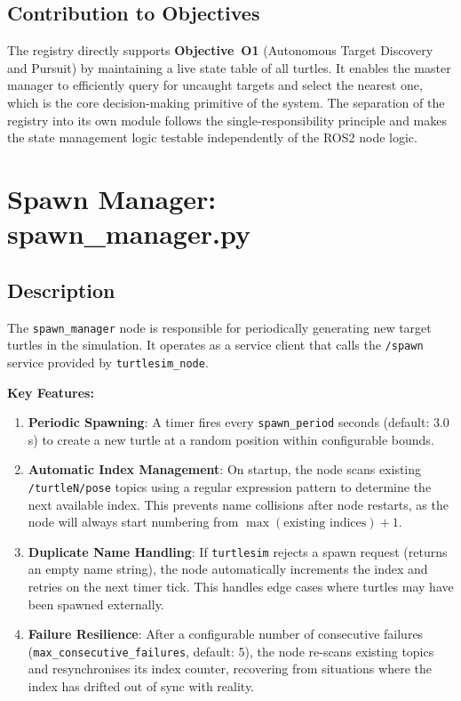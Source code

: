 \subsection{Contribution to Objectives}

The registry directly supports \textbf{Objective~O1} (Autonomous Target Discovery and Pursuit) by maintaining a live state table of all turtles. It enables the master manager to efficiently query for uncaught targets and select the nearest one, which is the core decision-making primitive of the system. The separation of the registry into its own module follows the single-responsibility principle and makes the state management logic testable independently of the ROS2 node logic.

\section{Spawn Manager: spawn\_manager.py}

\subsection{Description}

The \texttt{spawn\_manager} node is responsible for periodically generating new target turtles in the simulation. It operates as a service client that calls the \texttt{/spawn} service provided by \texttt{turtlesim\_node}.

\textbf{Key Features:}

\begin{enumerate}
  \item \textbf{Periodic Spawning}: A timer fires every \texttt{spawn\_period} seconds (default: 3.0\,s) to create a new turtle at a random position within configurable bounds.

  \item \textbf{Automatic Index Management}: On startup, the node scans existing \texttt{/turtleN/pose} topics using a regular expression pattern to determine the next available index. This prevents name collisions after node restarts, as the node will always start numbering from $\max(\text{existing indices}) + 1$.

  \item \textbf{Duplicate Name Handling}: If \texttt{turtlesim} rejects a spawn request (returns an empty name string), the node automatically increments the index and retries on the next timer tick. This handles edge cases where turtles may have been spawned externally.

  \item \textbf{Failure Resilience}: After a configurable number of consecutive failures (\texttt{max\_consecutive\_failures}, default: 5), the node re-scans existing topics and resynchronises its index counter, recovering from situations where the index has drifted out of sync with reality.
\end{enumerate}


